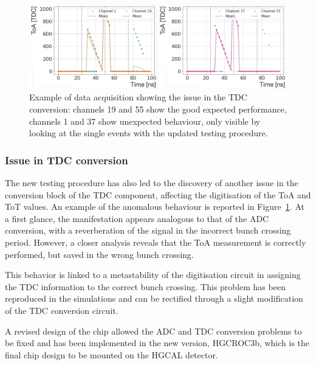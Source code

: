 \begin{figure}
    \centering
    \includegraphics[width=0.8\linewidth]{Figures/HGCAL/TDCIssue.pdf}
    \caption{Example of data acquisition showing the issue in the TDC conversion: channels 19 and 55 show the good expected performance, channels 1 and 37 show unexpected behaviour, only visible by looking at the single events with the updated testing procedure.}
    \label{fig:TDCIssue}
\end{figure}

\subsubsection{Issue in TDC conversion}
\label{subsubsec:Issue in TDC conversion}

The new testing procedure has also led to the discovery of another issue in the conversion block of the TDC component, affecting the digitisation of the ToA and ToT values. 
An example of the anomalous behaviour is reported in Figure~\ref{fig:TDCIssue}. At a first glance, the manifestation appears analogous to that of the ADC conversion, with a reverberation of the signal in the incorrect bunch crossing period. However, a closer analysis reveals that the ToA measurement is correctly performed, but saved in the wrong bunch crossing. 

This behavior is linked to a metastability of the digitisation circuit in assigning the TDC information to the correct bunch crossing. This problem has been reproduced in the simulations and can be rectified through a slight modification of the TDC conversion circuit.

\bigbreak

A revised design of the chip allowed the ADC and TDC conversion problems to be fixed and has been implemented in the new version, HGCROC3b, which is the final chip design to be mounted on the HGCAL detector. 


